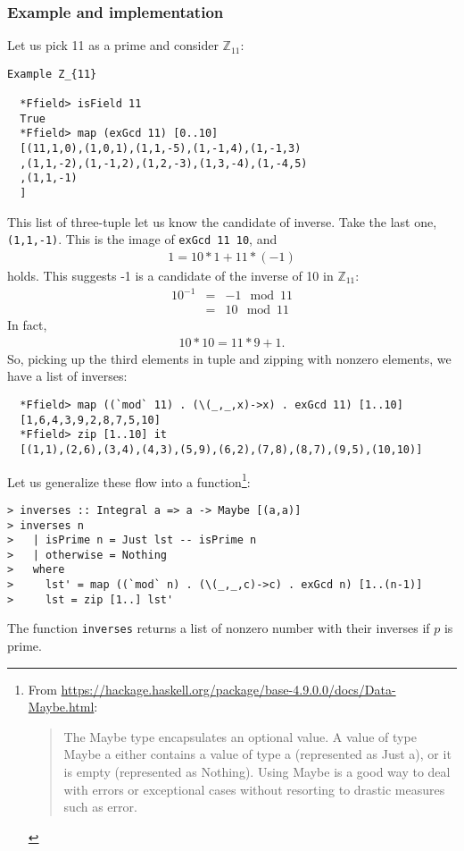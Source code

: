 \documentclass[11pt]{book}
\begin{document}
\subsubsection{Example and implementation}
Let us pick 11 as a prime and consider $\mathbb{Z}_{11}$:
\begin{verbatim}
Example Z_{11}

  *Ffield> isField 11
  True
  *Ffield> map (exGcd 11) [0..10]
  [(11,1,0),(1,0,1),(1,1,-5),(1,-1,4),(1,-1,3)
  ,(1,1,-2),(1,-1,2),(1,2,-3),(1,3,-4),(1,-4,5)
  ,(1,1,-1)
  ]
\end{verbatim}
This list of three-tuple let us know the candidate of inverse.
Take the last one, \verb+(1,1,-1)+.
This is the image of \verb+exGcd 11 10+, and 
\begin{eqnarray}
1 = 10*1 + 11*(-1)
\end{eqnarray}
holds.
This suggests -1 is a candidate of the inverse of 10 in $\mathbb{Z}_{11}$:
\begin{eqnarray}
10^{-1} &=& -1 \mod 11 \\
&=& 10 \mod 11
\end{eqnarray}
In fact,
\begin{eqnarray}
10*10 = 11*9+1.
\end{eqnarray}
So, picking up the third elements in tuple and zipping with nonzero elements, we have a list of inverses:
\begin{verbatim}
  *Ffield> map ((`mod` 11) . (\(_,_,x)->x) . exGcd 11) [1..10] 
  [1,6,4,3,9,2,8,7,5,10]
  *Ffield> zip [1..10] it
  [(1,1),(2,6),(3,4),(4,3),(5,9),(6,2),(7,8),(8,7),(9,5),(10,10)]
\end{verbatim}

Let us generalize these flow into a function\footnote{
From \url{https://hackage.haskell.org/package/base-4.9.0.0/docs/Data-Maybe.html}:
\begin{quotation}
The Maybe type encapsulates an optional value. 
A value of type Maybe a either contains a value of type a (represented as Just a), or it is empty (represented as Nothing). 
Using Maybe is a good way to deal with errors or exceptional cases without resorting to drastic measures such as error.
\end{quotation}
}:
\begin{verbatim}
> inverses :: Integral a => a -> Maybe [(a,a)]
> inverses n
>   | isPrime n = Just lst -- isPrime n
>   | otherwise = Nothing
>   where
>     lst' = map ((`mod` n) . (\(_,_,c)->c) . exGcd n) [1..(n-1)]
>     lst = zip [1..] lst'
\end{verbatim}
The function \texttt{inverses} returns a list of nonzero number with their inverses if $p$ is prime.
\end{document}
